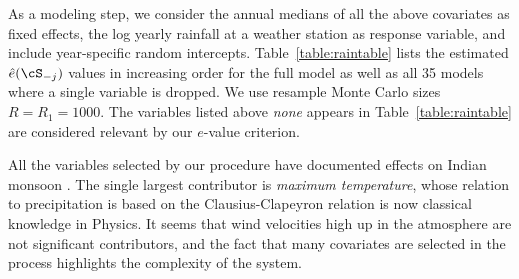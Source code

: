 As a modeling step, we consider the  annual medians of all the above covariates as fixed effects, the log yearly rainfall at a weather station as response variable, and include year-specific random intercepts. Table~\ref{table:raintable} lists the estimated $\hat{e} (\cS_{ -j})$ values in increasing order for the full model as well as all 35  models where a single variable is dropped. We use resample Monte Carlo sizes $R = R_1 = 1000$. The variables listed above {\textit{none}} appears in Table~\ref{table:raintable} are considered relevant by our $e$-value criterion.

All the variables selected by our procedure have documented effects on Indian monsoon \cite{KrishChapter, MoonWangHa12}. The single largest contributor is {\textit{maximum temperature}}, whose relation to  precipitation is based on the Clausius-Clapeyron relation is now classical knowledge in Physics. It seems 
that wind velocities high up in the atmosphere are not significant contributors, and the fact that many covariates are selected in the process highlights the complexity of the system.


